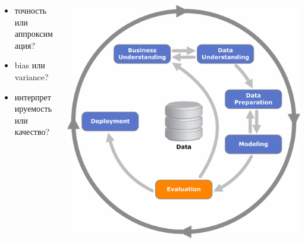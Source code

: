 \documentclass[10pt]{beamer}
\begin{document}
\begin{frame}{}

\begin{columns}[C]
    \begin{column}{.5\textwidth}

	\begin{itemize}
	\item точность или аппроксимация?
	\item bias или variance?
	\item интерпретируемость или качество?
	\end{itemize}    
    	
    \end{column}
       
    \begin{column}{.5\textwidth}
    \vspace{-0em}
	\begin{center}
   		\includegraphics[width=\textwidth]{images/crisp-e.png}
    \end{center}
    \end{column}
  \end{columns}

\end{frame}
\end{document}
